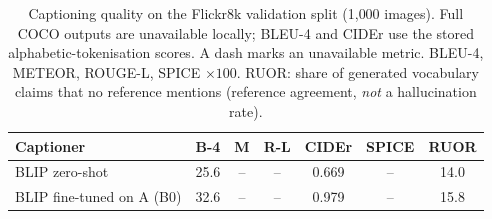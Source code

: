 \begin{table}[t]
\caption{Captioning quality on the Flickr8k validation split (1{,}000 images). Full COCO outputs are unavailable locally; BLEU-4 and CIDEr use the stored alphabetic-tokenisation scores. A dash marks an unavailable metric. 
BLEU-4, METEOR, ROUGE-L, SPICE $\times100$. RUOR: share of generated vocabulary claims that
no reference mentions (reference agreement, \emph{not} a hallucination rate).}
\label{tab:caption}
\centering\footnotesize\setlength{\tabcolsep}{3pt}
\begin{tabular}{@{}lcccccc@{}}
\toprule
Captioner & B-4 & M & R-L & CIDEr & SPICE & RUOR \\
\midrule
BLIP zero-shot & 25.6 & -- & -- & 0.669 & -- & 14.0 \\
BLIP fine-tuned on A (B0) & 32.6 & -- & -- & 0.979 & -- & 15.8 \\
\bottomrule
\end{tabular}
\end{table}
